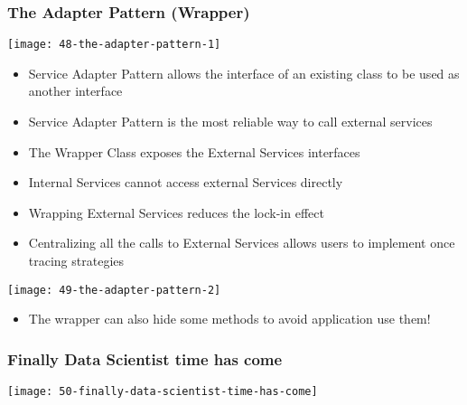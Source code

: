 \subsubsection{The Adapter Pattern (Wrapper)}

\begin{center}
\texttt{[image: 48-the-adapter-pattern-1]}
\end{center}

\begin{itemize}
	\item Service Adapter Pattern allows the interface of an existing class to be used as  another interface
	\item Service Adapter Pattern is the most reliable way to call external services
	\item The Wrapper Class exposes the External Services interfaces
	\item Internal Services cannot access external Services directly
	\item Wrapping External Services reduces the lock-in effect
	\item Centralizing all the calls to External Services allows users to implement once tracing strategies
\end{itemize}

\begin{center}
\texttt{[image: 49-the-adapter-pattern-2]}
\end{center}

\begin{itemize}
	\item The wrapper can also hide some methods to avoid application use them!
\end{itemize}

\subsubsection{Finally Data Scientist time has come}

\begin{center}
\texttt{[image: 50-finally-data-scientist-time-has-come]}
\end{center}